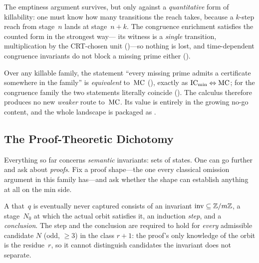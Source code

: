 The emptiness argument survives, but only against a \emph{quantitative}
form of killability: one must know how many transitions the reach takes,
because a $k$-step reach from stage~$n$ lands at stage~$n+k$.  The
congruence enrichment satisfies the counted form in the strongest way---
its witness is a \emph{single} transition, multiplication by the
CRT-chosen unit
()---so
nothing is lost, and time-dependent congruence invariants do not block a
missing prime either
().

\begin{remark}
\label{rem:trace-complete}
Over any killable family, the statement ``every missing prime admits a
certificate somewhere in the family'' is \emph{equivalent} to~$\mathrm{MC}$
(),
exactly as $\mathrm{IC}_{\min} \Leftrightarrow \mathrm{MC}$; for the congruence
family the two statements literally coincide
().
The calculus therefore produces no new \emph{weaker} route to~$\mathrm{MC}$.
Its value is entirely in the growing no-go content, and the whole
landscape is packaged as
.
\end{remark}

\subsection{The Proof-Theoretic Dichotomy}
\label{sec:proof-fragment}

Everything so far concerns \emph{semantic} invariants: sets of states.
One can go further and ask about \emph{proofs}.  Fix a proof shape---the
one every classical omission argument in this family has---and ask
whether the shape can establish anything at all on the min side.

\begin{definition}
\label{def:fragment}
A  that~$q$ is eventually
never captured consists of an invariant $\mathrm{inv} \subseteq
\mathbb{Z}/m\mathbb{Z}$, a stage~$N_0$ at which the actual orbit satisfies it, an
induction \emph{step}, and a \emph{conclusion}.  The step and the
conclusion are required to hold for \emph{every} admissible candidate
$N$ (odd, $\geq 3$) in the class $r+1$: the proof's only knowledge of
the orbit is the residue~$r$, so it cannot distinguish candidates the
invariant does not separate.
\end{definition}

